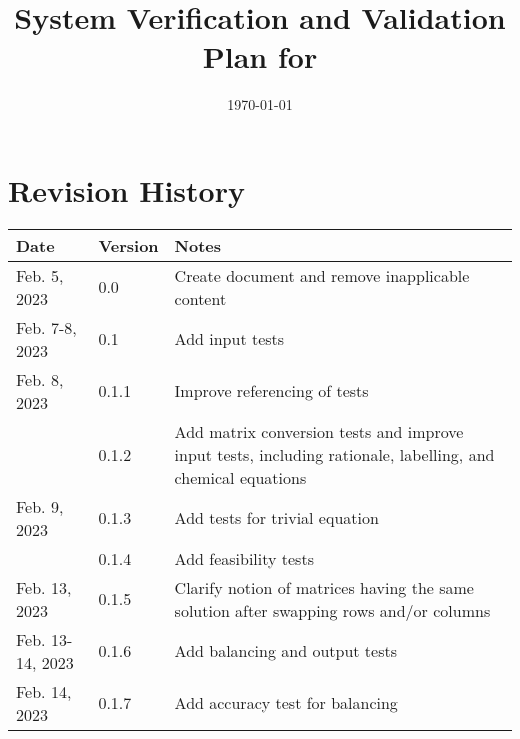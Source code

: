 \documentclass[12pt, titlepage]{article}
\begin{document}
\title{%
  System Verification and Validation Plan for \progname{}}
\author{\authname}
\date{\today}

\maketitle


\section{Revision History}

\begin{tabularx}{\textwidth}{llX}
  \toprule {\bf Date} & {\bf Version} & {\bf Notes}                       \\
  \midrule
  Feb. 5, 2023        & 0.0           & Create document and remove
  inapplicable content                                                    \\
  Feb. 7-8, 2023      & 0.1           & Add input tests                   \\
  Feb. 8, 2023        & 0.1.1         & Improve referencing of tests      \\
                      & 0.1.2         & Add matrix conversion tests and
  improve input tests, including rationale, labelling, and chemical
  equations                                                               \\
  Feb. 9, 2023        & 0.1.3         & Add tests for trivial equation    \\
                      & 0.1.4         & Add feasibility tests             \\
  Feb. 13, 2023       & 0.1.5         & Clarify notion of matrices having
  the same solution after swapping rows and/or columns                    \\
  Feb. 13-14, 2023    & 0.1.6         & Add balancing and output tests    \\
  Feb. 14, 2023       & 0.1.7         & Add accuracy test for balancing   \\
  \bottomrule
\end{tabularx}

\newpage

\tableofcontents

\listoftables
{}

\listoffigures
{}
\end{document}
